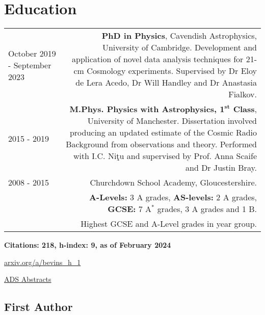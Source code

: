 \documentclass{article}
\begin{document}
\section*{Education}
\begin{tabular}{L!{\vrule}R}
	October 2019 - September 2023 & \textbf{PhD in Physics}, Cavendish Astrophysics, University of Cambridge. Development and application of novel data analysis techniques for 21-cm Cosmology experiments. Supervised by Dr Eloy de Lera Acedo, Dr Will Handley and Dr Anastasia Fialkov. \\
	2015 - 2019 & \textbf{M.Phys. Physics with Astrophysics, $\mathbf{1^{st}}$ Class}, University of Manchester. Dissertation involved producing an updated estimate of the Cosmic Radio Background from observations and theory. Performed with I.C. Ni\c{t}u and supervised by Prof. Anna Scaife and Dr Justin Bray. \\
	2008 - 2015 & Churchdown School Academy, Gloucestershire. \\ &\textbf{A-Levels:} 3 A grades, \textbf{AS-levels:} 2 A grades, \textbf{GCSE:} 7 A$^*$ grades, 3 A grades and 1 B. \\ & Highest GCSE and A-Level grades in year group.
\end{tabular}

 \hfill \textbf{Citations: 218, h-index: 9, as of February 2024}

\hfill \href{http://arxiv.org/a/bevins_h_1}{arxiv.org/a/bevins\_h\_1}

\hfill \href{https://ui.adsabs.harvard.edu/search/p_=0&q=author\%3A\%22Bevins\%2C\%20H.\%20T.\%20J.\%22&sort=date\%20desc\%2C\%20bibcode\%20desc}{ADS Abstracts}

\subsection*{First Author}
\end{document}
